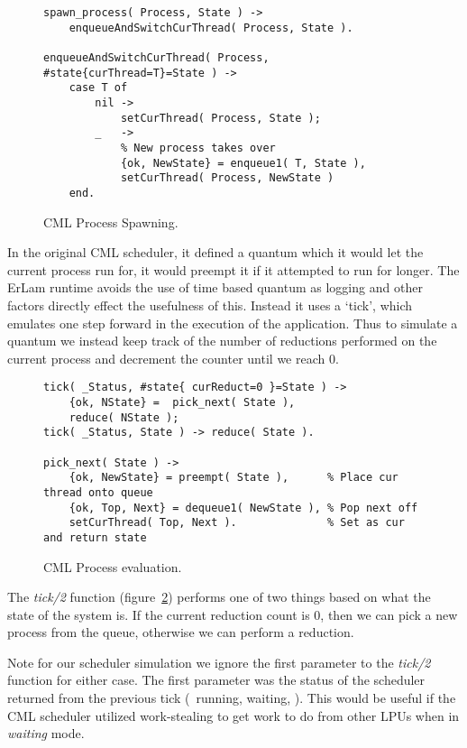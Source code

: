 \begin{figure}
\begin{verbatim}
spawn_process( Process, State ) -> 
    enqueueAndSwitchCurThread( Process, State ).

enqueueAndSwitchCurThread( Process, #state{curThread=T}=State ) ->
    case T of
        nil ->
            setCurThread( Process, State );
        _   ->
            % New process takes over
            {ok, NewState} = enqueue1( T, State ), 
            setCurThread( Process, NewState )
    end.
\end{verbatim}
\caption{CML Process Spawning.}
\label{fig:cml-spawn-process}
\end{figure}

In the original CML scheduler, it defined a quantum which it would let the 
current process run for, it would preempt it if it attempted to run 
for longer. The ErLam runtime avoids the use of time based quantum as logging 
and other factors directly effect the usefulness of this. Instead it uses a 
`tick', which emulates one
step forward in the execution of the application. Thus to simulate a quantum we
instead keep track of the number of reductions performed on the current process
and decrement the counter until we reach $0$.

\begin{figure}
\begin{verbatim}
tick( _Status, #state{ curReduct=0 }=State ) ->
    {ok, NState} =  pick_next( State ),
    reduce( NState );
tick( _Status, State ) -> reduce( State ).

pick_next( State ) ->
    {ok, NewState} = preempt( State ),      % Place cur thread onto queue
    {ok, Top, Next} = dequeue1( NewState ), % Pop next off
    setCurThread( Top, Next ).              % Set as cur and return state
\end{verbatim}
\caption{CML Process evaluation.}
\label{fig:cml-tick}
\end{figure}

The \emph{tick/2} function (figure~\ref{fig:cml-tick}) performs one of two 
things based on what the state of the system is. If the current reduction count 
is $0$, then we can pick a new process from the queue, otherwise we can perform
a reduction. 

Note for our scheduler simulation we ignore the first parameter to the 
\emph{tick/2} function for either case. The first parameter was the status of 
the scheduler returned from the previous tick (\eg~running, waiting, \etc). This 
would be useful if the CML scheduler utilized work-stealing to get work to do
from other LPUs when in \emph{waiting} mode.


